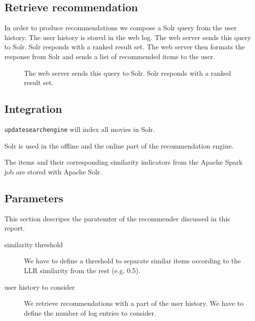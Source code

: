 \subsection{Retrieve recommendation}

In order to produce recommendations we compose a Solr query from the user history. The user history is stored in the web log. The web server sends this query to Solr. Solr responds with a ranked result set. The web server then formats the response from Solr and sends a list of recommended items to the user.

\begin{figure}
\centering
{}
\caption{The web server sends this query to Solr. Solr responds with a ranked result set.}
\end{figure}


\subsection{Integration}
\label{sec:integration}

\verb|updatesearchengine| will index all movies in Solr.

Solr is used in the offline and the online part of the recommendation engine.

The items and their corresponding similarity indicators from the Apache Spark job are stored with Apache Solr. 

\subsection{Parameters}
\label{sec:parameters}

This section descripes the paratemter of the recommender discussed in this report.
\begin{description}
\item[similarity threshold] We have to define a threshold to separate similar items occording to the LLR similarity from the rest (e.g. 0.5).
\item[user history to consider] We retrieve recommendations with a part of the user history. We have to define the number of log entries to consider.
\end{description}

